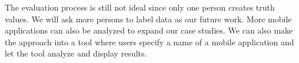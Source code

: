 The evaluation process is still not ideal since only one person creates truth values. We will ask more persons to label data as our future work. More mobile applications can also be analyzed to expand our case studies. We can also make the approach into a tool where users specify a name of a mobile application and let the tool analyze and display results.


%
%


%


